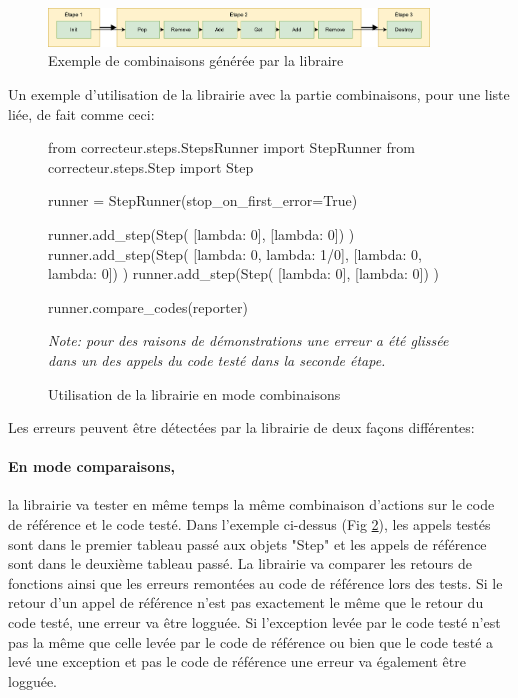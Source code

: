 \documentclass[a4paper]{report}
\begin{document}
\begin{figure}[ht]
	\begin{center}
		\includegraphics[width=0.9\textwidth]{img/combinator_exec.png} 
	\end{center}
	\caption{Exemple de combinaisons générée par la libraire}
	\label{fig:combinainaison_util_example}
\end{figure}

Un exemple d'utilisation de la librairie avec la partie combinaisons, pour une liste liée, de fait comme ceci:


\begin{figure}[ht]
\begin{python}
from correcteur.steps.StepsRunner import StepRunner
from correcteur.steps.Step import Step

runner = StepRunner(stop_on_first_error=True)

runner.add_step(Step(
	[lambda: 0],
	[lambda: 0])
)
runner.add_step(Step(
	[lambda: 0, lambda: 1/0],
	[lambda: 0, lambda: 0])
)
runner.add_step(Step(
	[lambda: 0],
	[lambda: 0])
)

runner.compare_codes(reporter)
\end{python}
	\caption{Utilisation de la librairie en mode combinaisons}
	
	\textit{Note: pour des raisons de démonstrations une erreur a été glissée dans un des appels du code testé dans la seconde étape.}	
	
	\label{fig:combinaisons_ref}
\end{figure}


Les erreurs peuvent être détectées par la librairie de deux façons différentes:

\paragraph{En mode comparaisons,} la librairie va tester en même temps la même combinaison d'actions sur le code de référence et le code testé.
Dans l'exemple ci-dessus (Fig \ref{fig:combinaisons_ref}), les appels testés sont dans le premier tableau passé aux objets "Step" et les appels de référence sont dans le deuxième tableau passé.
La librairie va  comparer les retours de fonctions ainsi que les erreurs remontées au code de référence lors des tests.
Si le retour d'un appel de référence n'est pas exactement le même que le retour du code testé, une erreur va être logguée.
Si l'exception levée par le code testé n'est pas la même que celle levée par le code de référence ou bien que le code testé a levé une exception et pas le code de référence une erreur va également être logguée. 
\end{document}
